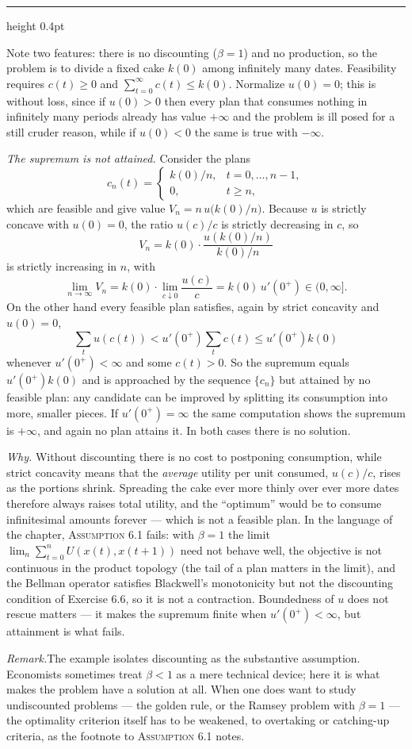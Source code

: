 \documentclass[11pt,letterpaper,reqno]{amsart}
\makeatletter
\newcommand{\as@head}[3]{%
  \par\addvspace{1.6ex}\penalty-200\relax
  \phantomsection
  \addcontentsline{toc}{subsection}{#1 #2\texorpdfstring{\ifx\relax#3\relax\else\quad #3\fi}{}}%
  {\color{RuleGrey}\hrule height 0.4pt}%
  \nobreak\vspace{0.8ex}\nobreak
  \noindent{\bfseries #1 #2}%
  \ifx\relax#3\relax\else\quad{\bfseries\itshape #3}\fi
  \par\nobreak\vspace{0.4ex}\nobreak
  \as@beginstatement
}
\newcommand{\as@beginstatement}{\begingroup\itshape\ignorespaces}
\newenvironment{aex}[2]{\as@head{Exercise}{#1}{#2}}{\par\addvspace{1.2ex}}
\newcommand{\rmk}[1]{%
  \par\vspace{0.6ex}%
  {\small\noindent\textit{Remark.}\hspace{0.5em}#1\par}%
  \vspace{0.4ex}%
}
\newcommand{\bk}[1]{\textup{\textsc{#1}}}
\renewcommand{\as@beginstatement}{\ignorespaces}
\makeatother
\begin{document}
\begin{aex}{6.15}{}
Note two features: there is no discounting ($\beta=1$) and no production, so the problem is to divide a
fixed cake $k(0)$ among infinitely many dates.  Feasibility requires $c(t)\ge0$ and
$\sum_{t=0}^{\infty}c(t)\le k(0)$.  Normalize $u(0)=0$; this is without loss, since if $u(0)>0$ then every plan that
consumes nothing in infinitely many periods already has value $+\infty$ and the problem is ill posed for a
still cruder reason, while if $u(0)<0$ the same is true with $-\infty$.

\emph{The supremum is not attained.}  Consider the plans
\[
c_n(t)=\begin{cases}k(0)/n,&t=0,\dots,n-1,\\ 0,&t\ge n,\end{cases}
\]
which are feasible and give value $V_n=n\,u\bigl(k(0)/n\bigr)$.  Because $u$ is strictly concave with
$u(0)=0$, the ratio $u(c)/c$ is strictly decreasing in $c$, so
\[
V_n=k(0)\cdot\frac{u(k(0)/n)}{k(0)/n}
\]
is strictly increasing in $n$, with
\[
\lim_{n\to\infty}V_n=k(0)\cdot\lim_{c\downarrow0}\frac{u(c)}{c}=k(0)\,u'(0^+)\in(0,\infty] .
\]
On the other hand every feasible plan satisfies, again by strict concavity and $u(0)=0$,
\[
\sum_{t}u(c(t))<u'(0^+)\sum_{t}c(t)\le u'(0^+)k(0)
\]
whenever $u'(0^+)<\infty$ and some $c(t)>0$.  So the supremum equals $u'(0^+)k(0)$ and is approached by the
sequence $\{c_n\}$ but attained by no feasible plan: any candidate can be improved by splitting its
consumption into more, smaller pieces.  If $u'(0^+)=\infty$ the same computation shows the supremum is
$+\infty$, and again no plan attains it.  In both cases there is no solution.

\emph{Why.}  Without discounting there is no cost to postponing consumption, while strict concavity means
that the \emph{average} utility per unit consumed, $u(c)/c$, rises as the portions shrink.  Spreading the
cake ever more thinly over ever more dates therefore always raises total utility, and the ``optimum'' would
be to consume infinitesimal amounts forever --- which is not a feasible plan.  In the language of the
chapter, \bk{Assumption 6.1} fails: with $\beta=1$ the limit
$\lim_n\sum_{t=0}^{n}U(x(t),x(t+1))$ need not behave well, the objective is not continuous in the product
topology (the tail of a plan matters in the limit), and the Bellman operator satisfies Blackwell's
monotonicity but not the discounting condition of Exercise 6.6, so it is not a contraction.  Boundedness of
$u$ does not rescue matters --- it makes the supremum finite when $u'(0^+)<\infty$, but attainment is what
fails.

\rmk{The example isolates discounting as the substantive assumption.  Economists sometimes treat
$\beta<1$ as a mere technical device; here it is what makes the problem have a solution at all.  When
one does want to study undiscounted problems --- the golden rule, or the Ramsey problem with $\beta=1$ ---
the optimality criterion itself has to be weakened, to overtaking or catching-up criteria, as the footnote
to \bk{Assumption 6.1} notes.}
\end{aex}
\end{document}
